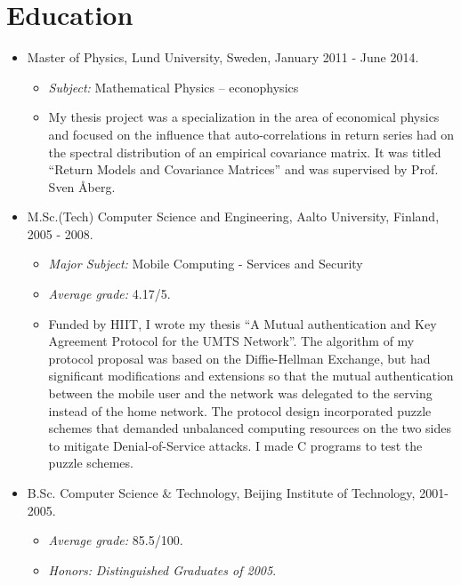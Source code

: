 \documentclass[10pt,letterpaper]{article}
\begin{document}
\section*{Education}
\begin{itemize}
\item Master of Physics, Lund University, Sweden, January 2011 - June
  2014.
  \begin{itemize}
  \item {\it Subject:} Mathematical Physics -- econophysics
  \item My thesis project was a specialization in the area of economical
    physics and focused on the influence that auto-correlations in 
    return series had on the spectral distribution of an empirical
    covariance matrix. It was titled ``Return Models and Covariance
    Matrices'' and was supervised by Prof. Sven \AA berg.
  \end{itemize}

\item M.Sc.(Tech) Computer Science and Engineering, Aalto University,
  Finland, 2005 - 2008.
  \begin{itemize}
  \item {\it Major Subject:} Mobile Computing - Services and Security
  \item {\it Average grade:} 4.17/5.
  \item   Funded by HIIT, I wrote my thesis ``A Mutual authentication
    and Key Agreement Protocol for the UMTS Network''. The algorithm of my
    protocol proposal was based on the Diffie-Hellman Exchange, but had
    significant modifications and extensions so that the mutual
    authentication between the mobile user and the network was delegated
    to the serving instead of the home network. The protocol design
    incorporated puzzle schemes that demanded unbalanced computing
    resources on the two sides to mitigate Denial-of-Service attacks. I
    made C programs to test the puzzle schemes.
  \end{itemize}

\item B.Sc. Computer Science \& Technology, Beijing Institute of
  Technology, 2001- 2005.
  \begin{itemize}
  \item {\it Average grade:} 85.5/100.
  \item {\it Honors:} \textit{Distinguished Graduates of 2005}.
  \end{itemize}
\end{itemize}
\end{document}
